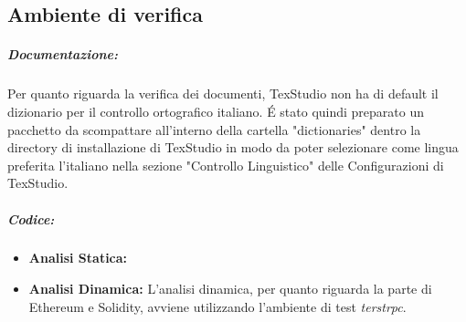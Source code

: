 \documentclass[NormeDiProgetto.tex]{subfiles}
\begin{document}
	\subsection{Ambiente di verifica}
	\subparagraph{Documentazione:} Per quanto riguarda la verifica dei documenti, TexStudio non
		ha di default il dizionario per il controllo ortografico italiano. \'{E}
		stato quindi preparato un pacchetto da scompattare all'interno della cartella
		"dictionaries" dentro la directory di installazione di TexStudio in modo da
		poter selezionare come lingua preferita l'italiano nella sezione "Controllo
		Linguistico" delle Configurazioni di TexStudio.
	\subparagraph{Codice:}
		\begin{itemize}
			\item \textbf{Analisi Statica:} %
			\item \textbf{Analisi Dinamica:} L'analisi dinamica, per quanto riguarda la parte di Ethereum e Solidity, avviene utilizzando l'ambiente di test \emph{terstrpc}.
		\end{itemize}
\end{document}
